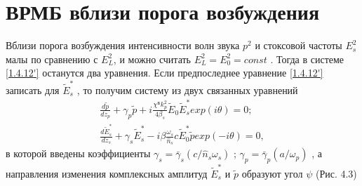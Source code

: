\documentclass[a4paper]{article}
\begin{document}
\section{ВРМБ вблизи порога возбуждения}

Вблизи порога возбуждения интенсивности волн звука $p^{2}$  и стоксовой частоты $E_{s}^{2}$  малы по сравнению с $E_{L}^{2}$, и  можно считать $E_{L}^{2}=E_{0}^{2}=const$ . Тогда в системе \eqref{1.4.12'}  останутся два уравнения. Если предпоследнее уравнение \eqref{1.4.12'} записать для $\tilde{E}_{s}^{*}$ , то получим систему из двух связанных уравнений 
\setcounter{equation}{12}
\begin{equation}
	\begin{split}
		\frac{d\tilde{p}}{dz_{p}}+\gamma_{p}\tilde{p}+i\frac{\chi^{\text{Б}}k_{p}^{2}}{4\beta_{s}}\tilde{E}_{0}\tilde{E}_{s}^{*}exp(i\theta)=0;\\
		\frac{d\tilde{E}_{s}^{*}}{dz_{s}}+\gamma_{s}\tilde{E}_{s}^{*}-i\beta\frac{\omega_{s}}{\hat{n}_{s}}c\tilde{E}_{0}^{*}\tilde{p}exp(-i\theta)=0,
	\end{split}
	\label{1.4.13}
\end{equation}
в которой введены коэффициенты $\gamma_{s}=\bar{\gamma}_{s}(c/\hat{n}_{s}\omega_{s})$ ; $\gamma_{p}=\bar{\gamma}_{p}(a/\omega_{p})$ , а направления изменения комплексных амплитуд $\tilde{E}_{s}^{*}$  и $\tilde{p}$  образуют угол $\psi$  (Рис. 4.3)
\end{document}
